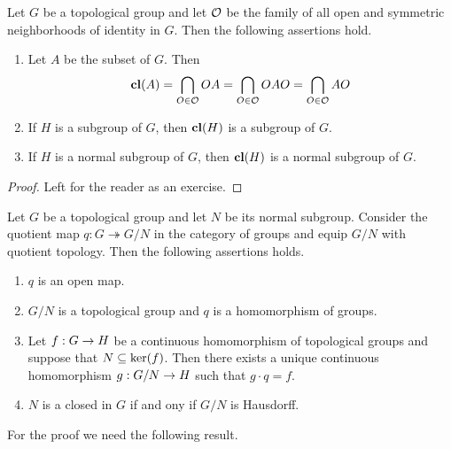 \documentclass[10pt]{amsart}
\begin{document}
\begin{fact}\label{fact:closures_in_topological_groups}
	Let $G$ be a topological group and let ${\mathcal O}$ be the family of all open and symmetric neighborhoods of identity in $G$. Then the following assertions hold.
	\begin{enumerate}[label=\emph{\textbf{(\arabic*)}}, leftmargin=*]
		\item Let $A$ be the subset of $G$. Then
		      $$\mathbf{cl}(A) = \bigcap_{O \in {\mathcal O}}OA = \bigcap_{O \in {\mathcal O}}OAO = \bigcap_{O \in {\mathcal O}}AO$$
		\item If $H$ is a subgroup of $G$, then $\mathbf{cl}(H)$ is a subgroup of $G$.
		\item If $H$ is a normal subgroup of $G$, then $\mathbf{cl}(H)$ is a normal subgroup of $G$.
	\end{enumerate}
\end{fact}
\begin{proof}
	Left for the reader as an exercise.
\end{proof}

\begin{theorem}\label{theorem:quotients_of_topological_groups}
	Let $G$ be a topological group and let $N$ be its normal subgroup. Consider the quotient map $q:G\twoheadrightarrow G/N$ in the category of groups and equip $G/N$ with quotient topology. Then the following assertions holds.
	\begin{enumerate}[label=\emph{\textbf{(\arabic*)}}, leftmargin=*]
		\item $q$ is an open map.
		\item $G/N$ is a topological group and $q$ is a homomorphism of groups.
		\item Let $f:G\rightarrow H$ be a continuous homomorphism of topological groups and suppose that $N \subseteq \mathrm{ker}(f)$. Then there exists a unique continuous homomorphism $g:G/N\rightarrow H$ such that $g\cdot q = f$.
		\item $N$ is a closed in $G$ if and ony if $G/N$ is Hausdorff.
	\end{enumerate}
\end{theorem}
\noindent
For the proof we need the following result.
\end{document}
